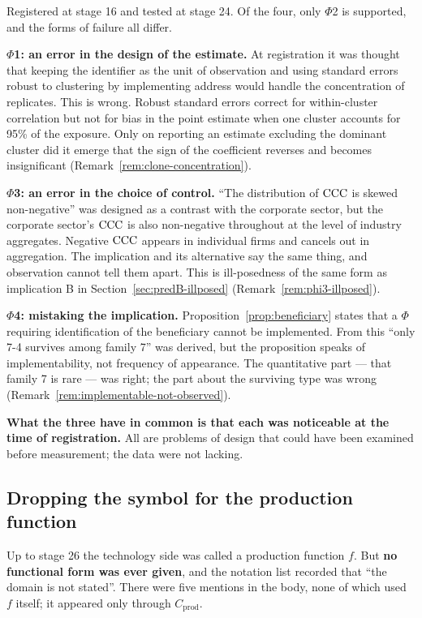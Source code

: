 Registered at stage 16 and tested at stage 24. Of the four, only $\Phi$2 is supported, and the
forms of failure all differ.

\textbf{$\Phi$1: an error in the design of the estimate.} At registration it was thought that
keeping the identifier as the unit of observation and using standard errors robust to clustering by
implementing address would handle the concentration of replicates. This is wrong. Robust standard
errors correct for within-cluster correlation but not for bias in the point estimate when one
cluster accounts for 95\% of the exposure. Only on reporting an estimate excluding the dominant
cluster did it emerge that the sign of the coefficient reverses and becomes insignificant
(Remark~\ref{rem:clone-concentration}).

\textbf{$\Phi$3: an error in the choice of control.} ``The distribution of $\mathrm{CCC}$ is skewed
non-negative'' was designed as a contrast with the corporate sector, but the corporate sector's
$\mathrm{CCC}$ is also non-negative throughout at the level of industry aggregates. Negative $\mathrm{CCC}$ appears
in individual firms and cancels out in aggregation. The implication and its alternative say the
same thing, and observation cannot tell them apart. This is ill-posedness of the same form as
implication B in Section~\ref{sec:predB-illposed} (Remark~\ref{rem:phi3-illposed}).

\textbf{$\Phi$4: mistaking the implication.} Proposition~\ref{prop:beneficiary} states that a
$\Phi$ requiring identification of the beneficiary cannot be implemented. From this ``only 7-4
survives among family 7'' was derived, but the proposition speaks of implementability, not
frequency of appearance. The quantitative part — that family 7 is rare — was right; the part about
the surviving type was wrong (Remark~\ref{rem:implementable-not-observed}).

\textbf{What the three have in common is that each was noticeable at the time of registration.}
All are problems of design that could have been examined before measurement; the data were not
lacking.

\subsection{Dropping the symbol for the production function}
\label{sec:drop-f}

Up to stage 26 the technology side was called a production function $f$. But \textbf{no functional
form was ever given}, and the notation list recorded that ``the domain is not stated''. There were
five mentions in the body, none of which used $f$ itself; it appeared only through
$C_{\mathrm{prod}}$.


